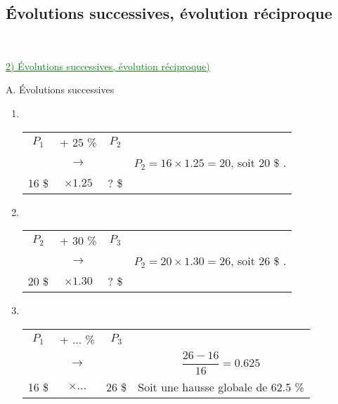 \documentclass[xcolor={dvipsnames}]{beamer}
\begin{document}
\subsection{\'Evolutions successives, évolution réciproque}


\begin{frame}
\

\textcolor{Green}{\underline{2) \'Evolutions successives, évolution réciproque)}}\\
 
 \vspace*{1cm}
 
A. \'Evolutions successives
\end{frame}

\begin{frame}{}

	\begin{enumerate}[1)]
		\item \
		
			\setlength{\tabcolsep}{4pt}
			\begin{table}[h!]
				\centering
				\begin{tabular}{|ccc|c|}
					\hline
					$P_1$ & + \num{25} \%  & $P_2$ &\\
					& {\LARGE $\rightarrow$} &	&	$P_2 = \num{16} \times \num{1.25} = 20$, soit 20 \$ .	\\
					\num{16} \$ & $\times \num{1.25}$ & ? \$ & \\
					\hline
				\end{tabular}
				
			\end{table}
		
		\pause
		
		\item \ 
		
		\begin{table}[h!]
			\centering
			\begin{tabular}{|ccc|c|}
				\hline
				$P_2$ & + \num{30} \%  & $P_3$ &\\
				& {\LARGE$\rightarrow$} &	&	$P_2 = \num{20} \times \num{1.30} = 26$, soit 26 \$ .	\\
				\num{20} \$ & $\times \num{1.30}$ & ? \$ & \\
				\hline
			\end{tabular}
			
		\end{table} \pause
		
				
		\item \ 
		\begin{table}[h!]
			\centering
			\begin{tabular}{|ccc|c|}
				\hline
				$P_1$ & + ... \%  & $P_3$ & \\
				& {\LARGE$\rightarrow$} &	&	 $\dfrac{\num{26} - \num{16}}{\num{16}} = \num{0.625}$	\\
				\num{16} \$ & $\times ...$ & 26 \$ & Soit une hausse globale de \num{62.5} \% \\
				\hline
			\end{tabular}
			

\end{table}
\end{enumerate}
\end{frame}
\end{document}
